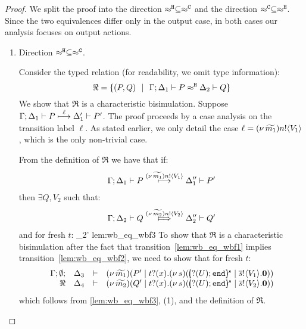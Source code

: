 \begin{proof}
	\noi
	We split the proof into the direction
	$\approx^\mathtt{H} \subseteq \approx^\mathtt{C}$ and the direction
	$\approx^\mathtt{C} \subseteq \approx^\mathtt{H}$.
 Since the two equivalences differ only in the output case, in both cases our analysis focuses on output actions.

	\begin{enumerate}
		\item	Direction $\approx^\mathtt{H} \subseteq \approx^\mathtt{C}$.

				\noi Consider the typed relation (for readability, we omit type information):
				\[
					\Re = \{
								(P, Q) 
								\ \ |\ \ 
								\Gamma; \Delta_1 \vdash P \approx^\mathtt{H} \Delta_2 \vdash Q\}
				\]
				We show that $\Re$ is a characteristic bisimulation.
				Suppose
				$
						\Gamma; \Delta_1 \vdash P \stackrel{ \ell}{\longmapsto} \Delta_1' \vdash P'
				$.
				The proof proceeds by a case analysis on the transition label $\ell$.
				As stated earlier, we only detail the case 
				$\ell = (\nu\, \widetilde{m_1}) n ! \langle V_1 \rangle$, which is the only non-trivial case.

							\smallskip
							
							 From the definition of $\Re$ we have that if:
							\begin{eqnarray}
								\Gamma; \Delta_1 \vdash P \stackrel{(\nu\, \widetilde{m_1}) n ! \langle V_1 \rangle}{\longmapsto} \Delta_1'' \vdash P'
								\label{lem:wb_eq_wbf1}
							\end{eqnarray}
							then $\exists Q, V_2$ such that:
							\begin{eqnarray}
								\horel{\Gamma}{\Delta_2}{Q}{\Hby{\news{\widetilde{m_2}} \bactout{n}{V_2}}}{\Delta_2''}{Q'}
								\label{lem:wb_eq_wbf2}
							\end{eqnarray}
							and for fresh $t$:
								{\hwb}
								{\Delta_2'}{}
								{lem:wb_eq_wbf3}
							\noi 
							To show that $\Re$ is a characteristic bisimulation
							after the fact that transition~\eqref{lem:wb_eq_wbf1} implies transition~\eqref{lem:wb_eq_wbf2},
							we need to show that for fresh $t$:
							\begin{eqnarray}
								\mhorel{\Gamma}{\Delta_3}{\newsp{\widetilde{m_1}}{P' \Par \fotrigger{t}{x}{s}{\btinp{U} \tinact}{V_1}}}
								{\Re}
								{\Delta_4}{}{\newsp{\widetilde{m_2}}{Q' \Par \fotrigger{t}{x}{s}{\btinp{U} \tinact}{V_2}}}
								\label{lem:wb_eq_wbf4}
							\end{eqnarray}
							\noi which follows from \eqref{lem:wb_eq_wbf3}, (1),
							and the definition of $\Re$.


\end{enumerate}
\end{proof}
